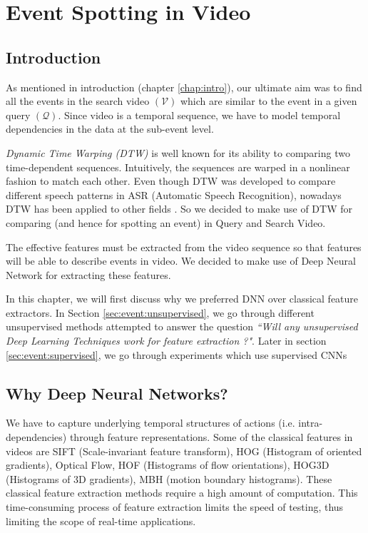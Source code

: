 \chapter{Event Spotting in Video}
\label{chap:event}

\section{Introduction}
As mentioned in introduction (chapter \ref{chap:intro}), our ultimate aim was to find all the events in the search video $(\mathcal{V})$ which are similar to the event in a given query $(\mathcal{Q})$. Since video is a temporal sequence, we have to model temporal dependencies in the data at the sub-event level. 

\textit{Dynamic Time Warping (DTW)} is well known for its ability to comparing two time-dependent sequences. Intuitively, the sequences are warped in a nonlinear fashion to match each other. Even though DTW was developed to compare different speech patterns in ASR (Automatic Speech Recognition), nowadays DTW has been applied to other fields \cite{muller2007information}.  So we decided to make use of DTW for comparing (and hence for spotting an event) in Query and Search Video.

The effective features must be extracted from the video sequence so that features will be able to describe events in video. We decided to make use of Deep Neural Network for extracting these features. 

In this chapter, we will first discuss why we preferred  DNN over classical feature extractors. In Section \ref{sec:event:unsupervised}, we go through different unsupervised methods attempted to answer the question \textit{``Will any unsupervised Deep Learning Techniques work for feature extraction ?"}. Later in section \ref{sec:event:supervised}, we go through experiments which use supervised CNNs  

\section{Why Deep Neural Networks?}
\label{sec:event:why}
We have to capture underlying temporal structures of actions (i.e. intra-dependencies) through feature representations. Some of the classical features in videos are SIFT (Scale-invariant feature transform), HOG (Histogram of oriented gradients), Optical Flow, HOF (Histograms of flow orientations), HOG3D (Histograms of 3D gradients), MBH (motion boundary histograms). These classical feature extraction methods require a high amount of computation\cite{baker2011database,chatfield2011devil}. This time-consuming process of feature extraction limits the speed of testing, thus limiting the scope of real-time applications.

